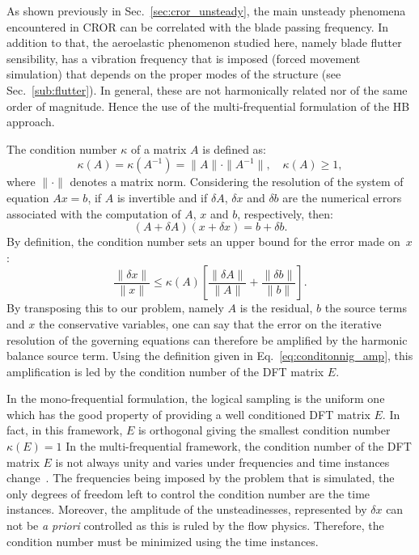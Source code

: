 
As shown previously in Sec.~\ref{sec:cror_unsteady}, the main unsteady
phenomena encountered in CROR can be correlated with the blade passing
frequency.
In addition to that, the aeroelastic phenomenon
studied here, namely blade flutter sensibility, has a vibration frequency that
is imposed (forced movement simulation) that depends on the proper modes
of the structure (see Sec.~\ref{sub:flutter}).
In general, these are not harmonically related nor
of the same order of magnitude. Hence the use of the
multi-frequential formulation of the HB approach. 

The condition number $\kappa$ of a matrix $A$ is defined as:
\begin{equation}
  \kappa (A) = \kappa (A^{-1}) = \| A \| \cdot \| A^{-1} \|, \quad
    \kappa(A) \geq 1,
\end{equation}
where $\| \cdot \|$ denotes a matrix norm. Considering the resolution
of the system of equation
$A x = b$, if $A$ is invertible and if $\delta A$, $\delta x$ and
$\delta b$ are the numerical errors associated with the computation of
$A$, $x$ and $b$, respectively, then:
\begin{equation}
   (A + \delta A)(x + \delta x) = b + \delta b.
   \label{eq:error_reso}
\end{equation}
By definition, the condition number sets an upper bound for 
the error made on~$x$:
\begin{equation}
   \frac{\| \delta x \|}{\| x \|} \leq 
   \kappa(A)\left[\frac{\| \delta A \|}{\| A \|} + 
   \frac{\| \delta b \|}{\| b \|} \right].
   \label{eq:conditonnig_amp}
\end{equation}
By transposing this to our problem, namely $A$ is the residual, 
$b$ the source terms and $x$ the conservative variables, one can say that
the error on the iterative resolution of the governing equations can
therefore be amplified by the harmonic balance source term.
Using the definition given in Eq.~\eqref{eq:conditonnig_amp}, this amplification is
led by the condition number of the DFT matrix $E$. 


In the mono-frequential formulation, the logical sampling is the uniform one
which has the good property of providing
a well conditioned DFT matrix $E$. In fact, in this framework, $E$ is orthogonal giving 
the smallest condition number $\kappa (E) = 1$
In the multi-frequential framework,
the condition number of the DFT matrix $E$ is not always unity and
varies under frequencies and time instances change~\cite{Kundert1988}. 
The frequencies
being imposed by the problem that is simulated,
the only degrees of freedom left to control the condition
number are the time instances. 
Moreover, the amplitude of the unsteadinesses, represented by $\delta x$
can not be \emph{a priori} controlled as this is ruled by the flow physics. 
Therefore, the condition
number must be minimized using the time instances.

